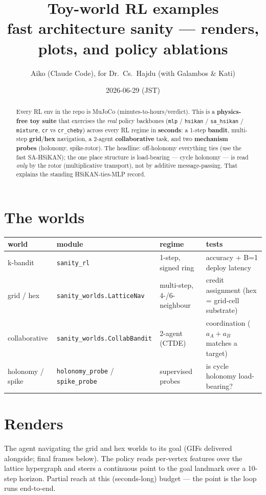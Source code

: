 \documentclass[11pt]{article}
\title{\textbf{Toy-world RL examples}\\[2pt]
\large fast architecture sanity --- renders, plots, and policy ablations}
\author{Aiko (Claude Code), for Dr.\ Cs.\ Hajdu (with Galambos \& Kati)}\date{2026-06-29 (JST)}
\begin{document}
\maketitle

\begin{abstract}
\noindent Every RL env in the repo is MuJoCo (minutes-to-hours/verdict). This is a \textbf{physics-free toy
suite} that exercises the \emph{real} policy backbones (\texttt{mlp} / \texttt{hsikan} / \texttt{sa\_hsikan} /
\texttt{mixture}, \texttt{cr} vs \texttt{cr\_cheby}) across every RL regime in \textbf{seconds}: a 1-step
\textbf{bandit}, multi-step \textbf{grid}/\textbf{hex} navigation, a 2-agent \textbf{collaborative} task, and two
\textbf{mechanism probes} (holonomy, spike-rotor). The headline: off-holonomy everything ties (use the fast
SA-HSiKAN); the one place structure is load-bearing --- cycle holonomy --- is read \emph{only} by the rotor
(multiplicative transport), not by additive message-passing. That explains the standing HSiKAN-ties-MLP record.
\end{abstract}

\section{The worlds}
\begin{center}\small
\begin{tabular}{llll}
\toprule
world & module & regime & tests \\
\midrule
k-bandit & \texttt{sanity\_rl} & 1-step, signed ring & accuracy + B=1 deploy latency \\
grid / hex & \texttt{sanity\_worlds.LatticeNav} & multi-step, 4-/6-neighbour & credit assignment (hex = grid-cell substrate) \\
collaborative & \texttt{sanity\_worlds.CollabBandit} & 2-agent (CTDE) & coordination ($a_A+a_B$ matches a target) \\
holonomy / spike & \texttt{holonomy\_probe} / \texttt{spike\_probe} & supervised probes & is cycle holonomy load-bearing? \\
\bottomrule
\end{tabular}
\end{center}

\section{Renders}
The agent navigating the grid and hex worlds to its goal (GIFs delivered alongside; final frames below). The
policy reads per-vertex features over the lattice hypergraph and steers a continuous point to the goal landmark
over a 10-step horizon. Partial reach at this (seconds-long) budget --- the point is the loop runs end-to-end.
\end{document}
